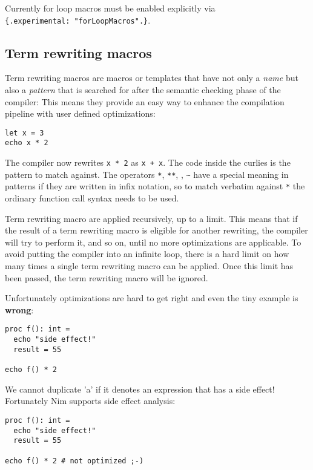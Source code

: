 Currently for loop macros must be enabled explicitly via
\texttt{\{.experimental:\ "forLoopMacros".\}}.

\hypertarget{term-rewriting-macros}{%
\subsection{Term rewriting macros}\label{term-rewriting-macros}}

Term rewriting macros are macros or templates that have not only a
\emph{name} but also a \emph{pattern} that is searched for after the
semantic checking phase of the compiler: This means they provide an easy
way to enhance the compilation pipeline with user defined optimizations:

\begin{verbatim}
let x = 3
echo x * 2
\end{verbatim}

The compiler now rewrites \texttt{x\ *\ 2} as \texttt{x\ +\ x}. The code
inside the curlies is the pattern to match against. The operators
\texttt{*}, \texttt{**}, \texttt{\textbar{}}, \texttt{\textasciitilde{}}
have a special meaning in patterns if they are written in infix
notation, so to match verbatim against \texttt{*} the ordinary function
call syntax needs to be used.

Term rewriting macro are applied recursively, up to a limit. This means
that if the result of a term rewriting macro is eligible for another
rewriting, the compiler will try to perform it, and so on, until no more
optimizations are applicable. To avoid putting the compiler into an
infinite loop, there is a hard limit on how many times a single term
rewriting macro can be applied. Once this limit has been passed, the
term rewriting macro will be ignored.

Unfortunately optimizations are hard to get right and even the tiny
example is \textbf{wrong}:

\begin{verbatim}
proc f(): int =
  echo "side effect!"
  result = 55

echo f() * 2
\end{verbatim}

We cannot duplicate 'a' if it denotes an expression that has a side
effect! Fortunately Nim supports side effect analysis:

\begin{verbatim}
proc f(): int =
  echo "side effect!"
  result = 55

echo f() * 2 # not optimized ;-)
\end{verbatim}

